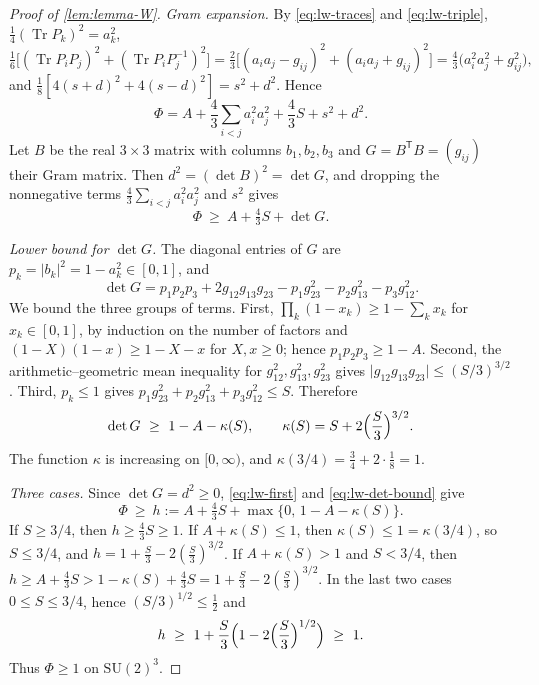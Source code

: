 \documentclass[11pt,a4paper]{amsart}
\theoremstyle{definition}
\theoremstyle{remark}
\numberwithin{equation}{section}
\DeclareMathOperator{\Tr}{Tr}        %
\newcommand{\abs}[1]{\lvert #1\rvert}      %
\newcommand{\SU}{\mathrm{SU}}              %
\begin{document}
\begin{proof}[Proof of \cref{lem:lemma-W}]
\emph{Gram expansion.} By \eqref{eq:lw-traces} and \eqref{eq:lw-triple}, $\frac14(\Tr P_k)^2=a_k^2$,
\[
\tfrac16\bigl[(\Tr P_iP_j)^2+(\Tr P_iP_j^{-1})^2\bigr]=\tfrac23\bigl[(a_ia_j-g_{ij})^2+(a_ia_j+g_{ij})^2\bigr]=\tfrac43\bigl(a_i^2a_j^2+g_{ij}^2\bigr),
\]
and $\frac18[4(s+d)^2+4(s-d)^2]=s^2+d^2$. Hence
\begin{equation}\label{eq:lw-gram}
\Phi=A+\frac43\sum_{i<j}a_i^2a_j^2+\frac43S+s^2+d^2 .
\end{equation}
Let $B$ be the real $3\times3$ matrix with columns $b_1,b_2,b_3$ and $G=B^{\mathsf T}B=(g_{ij})$ their Gram matrix. Then $d^2=(\det B)^2=\det G$, and dropping the nonnegative terms $\frac43\sum_{i<j}a_i^2a_j^2$ and $s^2$ gives
\begin{equation}\label{eq:lw-first}
\Phi\ \ge\ A+\tfrac43S+\det G .
\end{equation}

\emph{Lower bound for $\det G$.} The diagonal entries of $G$ are $p_k=\abs{b_k}^2=1-a_k^2\in[0,1]$, and
\[
\det G=p_1p_2p_3+2g_{12}g_{13}g_{23}-p_1g_{23}^2-p_2g_{13}^2-p_3g_{12}^2 .
\]
We bound the three groups of terms. First, $\prod_k(1-x_k)\ge1-\sum_kx_k$ for $x_k\in[0,1]$, by induction on the number of factors and $(1-X)(1-x)\ge1-X-x$ for $X,x\ge0$; hence $p_1p_2p_3\ge1-A$. Second, the arithmetic--geometric mean inequality for $g_{12}^2,g_{13}^2,g_{23}^2$ gives $\abs{g_{12}g_{13}g_{23}}\le(S/3)^{3/2}$. Third, $p_k\le1$ gives $p_1g_{23}^2+p_2g_{13}^2+p_3g_{12}^2\le S$. Therefore
\begin{equation}\label{eq:lw-det-bound}
\det G\ \ge\ 1-A-\kappa(S),\qquad\kappa(S)=S+2\Bigl(\frac S3\Bigr)^{3/2}.
\end{equation}
The function $\kappa$ is increasing on $[0,\infty)$, and $\kappa(3/4)=\frac34+2\cdot\frac18=1$.

\emph{Three cases.} Since $\det G=d^2\ge0$, \eqref{eq:lw-first} and \eqref{eq:lw-det-bound} give
\[
\Phi\ \ge\ h:=A+\tfrac43S+\max\{0,\,1-A-\kappa(S)\}.
\]
If $S\ge3/4$, then $h\ge\frac43S\ge1$. If $A+\kappa(S)\le1$, then $\kappa(S)\le1=\kappa(3/4)$, so $S\le3/4$, and $h=1+\frac S3-2(\frac S3)^{3/2}$. If $A+\kappa(S)>1$ and $S<3/4$, then $h\ge A+\frac43S>1-\kappa(S)+\frac43S=1+\frac S3-2(\frac S3)^{3/2}$. In the last two cases $0\le S\le3/4$, hence $(S/3)^{1/2}\le\frac12$ and
\[
h\ \ge\ 1+\frac S3\Bigl(1-2\Bigl(\frac S3\Bigr)^{1/2}\Bigr)\ \ge\ 1 .
\]
Thus $\Phi\ge1$ on $\SU(2)^3$.


\end{proof}
\end{document}
